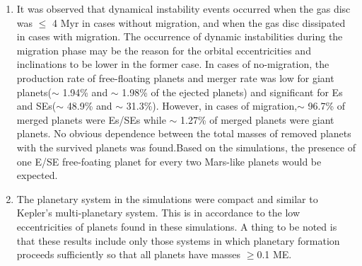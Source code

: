 \begin{enumerate}
\item It was observed that dynamical instability events occurred when the gas disc was $\leq$ 4 Myr in cases without migration, and when the gas disc dissipated in cases with migration. The occurrence of dynamic instabilities during the migration phase may be the reason for the orbital eccentricities and inclinations to be lower in the former case. In cases of no-migration, the production rate of free-floating planets and merger rate was low for giant planets($\sim$ 1.94\% and $\sim$ 1.98\% of the ejected planets) and significant for Es and SEs($\sim$ 48.9\% and $\sim$ 31.3\%). However, in cases of migration,$\sim$ 96.7\% of merged planets were Es/SEs  while $\sim$ 1.27\% of merged planets were giant planets. No obvious dependence between the total masses of removed planets with the survived planets was found.Based on the simulations, the presence of one E/SE free-foating planet for every two Mars-like planets would be expected.

\item The planetary system in the simulations were compact and similar to Kepler's multi-planetary system. This is in accordance to the low eccentricities of planets found in these simulations. A thing to be noted is that these results include only those systems in which planetary formation proceeds sufficiently so that all planets have masses $\geq$0.1 ME.


\end{enumerate}


